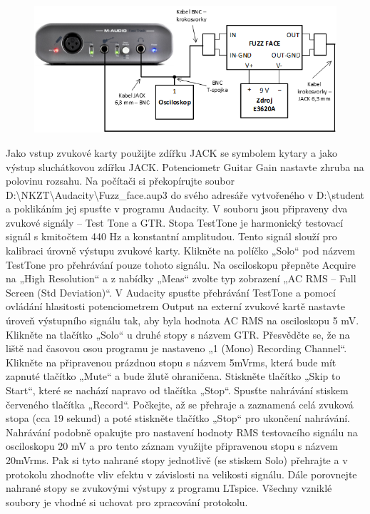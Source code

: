 \documentclass[a4paper, czech]{article}
\begin{document}
\begin{enumerate}
    \begin{figure}[H]
        \centering
        \includegraphics{ukoly_obrazek_2.png}
    \end{figure}
    Jako vstup zvukové karty použijte zdířku JACK se symbolem kytary a jako výstup sluchátkovou zdířku JACK. Potenciometr Guitar Gain nastavte zhruba na polovinu rozsahu. Na počítači si překopírujte soubor \\ D:\textbackslash NKZT\textbackslash Audacity\textbackslash Fuzz\_face.aup3 do svého adresáře vytvořeného v D:\textbackslash student a poklikáním jej spusťte v programu Audacity. V souboru jsou připraveny dva zvukové signály – Test Tone a GTR. Stopa TestTone je harmonický testovací signál s kmitočtem 440 Hz a konstantní amplitudou. Tento signál slouží pro kalibraci úrovně výstupu zvukové karty. Klikněte na políčko „Solo“ pod názvem TestTone pro přehrávání pouze tohoto signálu. Na osciloskopu přepněte Acquire na „High Resolution“ a z nabídky „Meas“ zvolte typ zobrazení „AC RMS – Full Screen (Std Deviation)“. V Audacity spusťte přehrávání TestTone a pomocí ovládání hlasitosti potenciometrem Output na externí zvukové kartě nastavte úroveň výstupního signálu tak, aby byla hodnota AC RMS na osciloskopu 5 mV. Klikněte na tlačítko „Solo“ u druhé stopy s názvem GTR. Přesvědčte se, že na liště nad časovou osou programu je nastaveno „1 (Mono) Recording Channel“. Klikněte na připravenou prázdnou stopu s názvem 5mVrms, která bude mít zapnuté tlačítko „Mute“ a bude žlutě ohraničena. Stiskněte tlačítko „Skip to Start“, které se nachází napravo od tlačítka „Stop“. Spusťte nahrávání stiskem červeného tlačítka „Record“. Počkejte, až se přehraje a zaznamená celá zvuková stopa (cca 19 sekund) a poté stiskněte tlačítko „Stop“ pro ukončení nahrávání. Nahrávání podobně opakujte pro nastavení hodnoty RMS testovacího signálu na osciloskopu 20 mV a pro tento záznam využijte připravenou stopu s názvem 20mVrms. Pak si tyto nahrané stopy jednotlivě (se stiskem Solo) přehrajte a v protokolu zhodnoťte vliv efektu v závislosti na velikosti signálu. Dále porovnejte nahrané stopy se zvukovými výstupy z programu LTspice. Všechny vzniklé soubory je vhodné si uchovat pro zpracování protokolu.
\end{enumerate}
\end{document}
